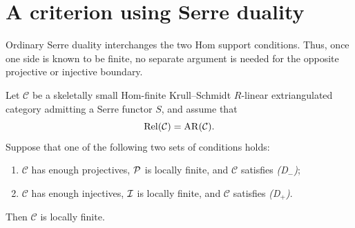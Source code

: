 \documentclass[11pt, twoside]{article}
\def\C{\mathcal{C}}
\numberwithin{equation}{section}
\begin{document}


\section{A criterion using Serre duality}\label{sec:serre}

Ordinary Serre duality interchanges the two Hom support conditions.  Thus,
once one side is known to be finite, no separate argument is needed for the
opposite projective or injective boundary.

\begin{theorem}\label{thm:Serre-one-sided}
Let $\C$ be a skeletally small Hom-finite Krull--Schmidt $R$-linear
extriangulated category admitting a Serre functor $S$, and assume that
\[
 \Rel(\C)=\AR(\C).
\]
Suppose that one of the following two sets of conditions holds:
\begin{enumerate}[label=\textup{(\arabic*)},leftmargin=2.7em]
\item $\C$ has enough projectives, $\mathcal{P}$ is locally finite, and $\C$
satisfies \emph{(D$_-$)};
\item $\C$ has enough injectives, $\mathcal{I}$ is locally finite, and $\C$
satisfies \emph{(D$_+$)}.
\end{enumerate}
Then $\C$ is locally finite.
\end{theorem}
\end{document}
